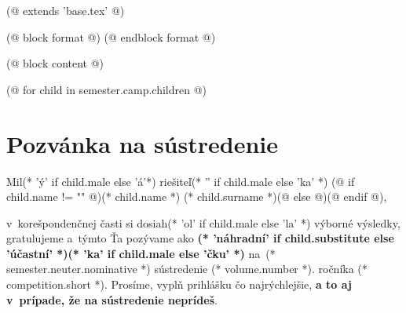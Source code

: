 (@ extends 'base.tex' @)

(@ block format @)
    \renewcommand{\headrulewidth}{0pt}
    \renewcommand{\footrulewidth}{0pt}
(@ endblock format @)

(@ block content @)
    \pagestyle{seminar-invite}

    (@ for child in semester.camp.children @)
        \section{Pozvánka na sústredenie}
            Mil(* 'ý' if child.male else 'á'*) riešiteľ(* '' if child.male else 'ka' *)
            (@ if child.name != "" @)(* child.name *) (* child.surname *)(@ else @)\makebox[50mm]{\dotfill}(@ endif @),

            v~korešpondenčnej časti si dosiah(* 'ol' if child.male else 'la' *) výborné výsledky,
            gratulujeme a~týmto Ťa pozývame ako \textbf{(* 'náhradní' if child.substitute else 'účastní' *)(* 'ka' if child.male else 'čku' *)}
            na~(* semester.neuter.nominative *) sústredenie (* volume.number *). ročníka (* competition.short *).
            Prosíme, vyplň prihlášku čo najrýchlejšie, \textbf{a to aj v~prípade, že na sústredenie neprídeš}.

